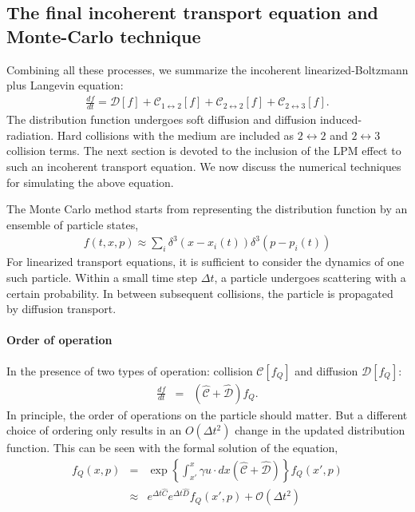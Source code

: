 \subsection{The final incoherent transport equation and Monte-Carlo technique}
Combining all these processes, we summarize the incoherent linearized-Boltzmann plus Langevin equation:
\begin{eqnarray}
\frac{df}{dt} = \mathcal{D}[f] + \mathcal{C}_{1\leftrightarrow 2}[f] + \mathcal{C}_{2\leftrightarrow 2}[f] + \mathcal{C}_{2\leftrightarrow 3}[f].
\end{eqnarray}
The distribution function undergoes soft diffusion and diffusion induced-radiation. 
Hard collisions with the medium are included as $2\leftrightarrow 2$ and $2\leftrightarrow 3$ collision terms.
The next section is devoted to the inclusion of the LPM effect to such an incoherent transport equation.
We now discuss the numerical techniques for simulating the above equation.

The Monte Carlo method starts from representing the distribution function by an ensemble of particle states,
\begin{eqnarray}
f(t,x,p) \approx \sum_{i} \delta^3(x-x_i(t)) \delta^3(p-p_i(t))
\end{eqnarray}
For linearized transport equations, it is sufficient to consider the dynamics of one such particle.
Within a small time step $\Delta t$, a particle undergoes scattering with a certain probability.
In between subsequent collisions, the particle is propagated by diffusion transport.

\paragraph{Order of operation} In the presence of two types of operation: collision $\mathcal{C}[f_Q]$ and diffusion $\mathcal{D}[f_Q]$:
\begin{eqnarray}
\nonumber
  \frac{df}{dt}  &=& 
\left( \mathcal{\hat{C}} + \mathcal{\hat{D}} \right) f_Q.
\end{eqnarray}
In principle, the order of operations on the particle should matter.
But a different choice of ordering only results in an $O(\Delta t^2)$ change in the updated distribution function.
This can be seen with the formal solution of the equation,
\begin{eqnarray}
\nonumber
f_Q(x,p) &=& \exp\left\{ \int_{x'}^x \gamma u \cdot dx \left( \mathcal{\hat{C}} + \mathcal{\hat{D}} \right) \right\} f_Q(x',p)\\
&\approx & e^{\Delta t \hat{C}}e^{\Delta t \hat{D}} f_Q(x', p) + \mathcal{O}(\Delta t^2)
\end{eqnarray}

